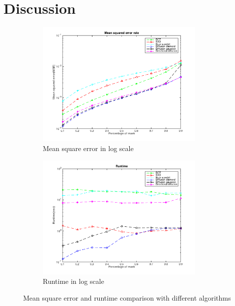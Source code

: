 \section{Discussion}
\label{sec:discussion}

\begin{figure}
	\centering
	\begin{subfigure}[b]{0.48\textwidth}
		\centering
		\includegraphics[clip, trim=1cm 0cm 1cm 0cm, width=0.9\textwidth]{figures/mse}
		\caption{Mean square error in log scale}
		\label{fig:err_random}
	\end{subfigure}
	\begin{subfigure}[b]{0.48\textwidth}
		\centering
		\includegraphics[clip, trim=1cm 0cm 1cm 0cm, width=0.9\textwidth]{figures/runtime}
		\caption{Runtime in log scale}
		\label{fig:runtime}
	\end{subfigure}
	
	\caption{Mean square error and runtime comparison with different algorithms}
	\label{fig:results}
\end{figure}


